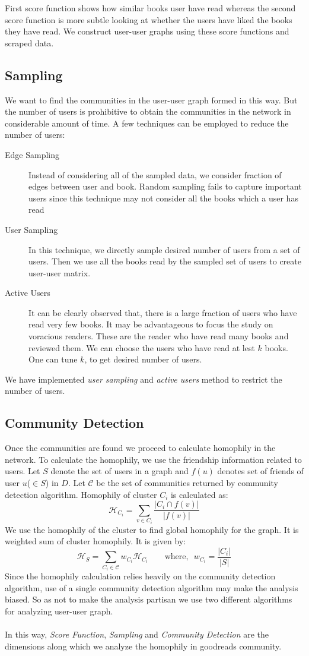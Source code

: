 \documentclass[11pt]{article}
\begin{document}
First score function shows how similar books user have read whereas the second score function is more subtle looking at whether the users have liked the books they have read. We construct user-user graphs using these score functions and scraped data.

\subsection{Sampling}
We want to find the communities in the user-user graph formed in this way. But the number of users is prohibitive to obtain the communities in the network in considerable amount of time. A few techniques can be employed to reduce the number of users:
\begin{description}
	\item[Edge Sampling] Instead of considering all of the sampled data, we consider fraction of edges between user and book. Random sampling fails to capture important users since this technique may not consider all the books which a user has read
    \item[User Sampling] In this technique, we directly sample desired number of users from a set of users. Then we use all the books read by the sampled set of users to create user-user matrix.
    \item[Active Users] It can be clearly observed that, there is a large fraction of users who have read very few books. It may be advantageous to focus the study on voracious readers. These are the reader who have read many books and reviewed them. We can choose the users who have read at lest $k$ books. One can tune $k$, to get desired number of users.
\end{description}
We have implemented {\it user sampling} and {\it active users} method to restrict the number of users.

\subsection{Community Detection}
Once the communities are found we proceed to calculate homophily in the network. To calculate the homophily, we use the friendship information related to users. Let $S$ denote the set of users in a graph and $f(u)$ denotes set of friends of user $u$($\in S$) in $D$. Let $\mathcal{C}$ be the set of communities returned by community detection algorithm. Homophily of cluster $C_i$ is calculated as:
\[
\mathcal{H}_{C_i} = \sum_{v \in C_i} \frac{|C_i \cap f(v)|}{|f(v)|}
\]
We use the homophily of the cluster to find global homophily for the graph. It is weighted sum of cluster homophily. It is given by:
\[
\mathcal{H}_{S} = \sum_{C_i \in \mathcal{C}} w_{C_i} \mathcal{H}_{C_i} ~~~~~~~~~\textrm{where,}~~~w_{C_i} = \frac{|C_i|}{|S|}
\]
Since the homophily calculation relies heavily on the community detection algorithm, use of a single community detection algorithm may make the analysis biased. So as not to make the analysis partisan we use two different algorithms for analyzing user-user graph.\\\\
In this way, {\it Score Function}, {\it Sampling} and {\it Community Detection} are the dimensions along which we analyze the homophily in goodreads community.
\end{document}
